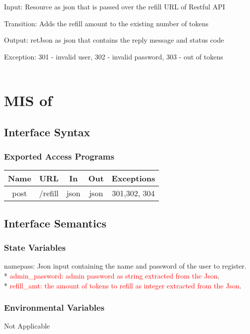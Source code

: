 \documentclass[12,english]{article}
\begin{document}
			Input: Resource as json that is passed over the refill URL of Restful API
			
			Transition: Adds the refill amount to the existing number of tokens
			
			Output: retJson as json that contains the reply message and status code
			
			Exception: 301 - invalid user, 302 - invalid password, 303 - out of tokens\\
			\\
			
			
	\section{MIS of }
		\subsection{Interface Syntax}
			\subsubsection{Exported Access Programs}
				\begin{tabular}[pos]{|c|c|c|c|c|}
					
					\hline
					\textbf{Name}& \textbf{URL} & \textbf{In} & \textbf{Out} & \textbf{Exceptions} \\ \hline
					post & \slash refill & json & json & 301,302, 304 \\ \hline
					
				\end{tabular}
				
		\subsection{Interface Semantics}
			\subsubsection{State Variables}
			namepass: Json input containing the name and password of the user to register. \\*
			\textcolor{red}{admin\_password: admin password as string extracted from the Json}.  \\*
			\textcolor{red}{refill\_amt: the amount of tokens to refill as integer extracted from the Json}. 
			
			\subsubsection{Environmental Variables}
			Not Applicable
			
\end{document}
